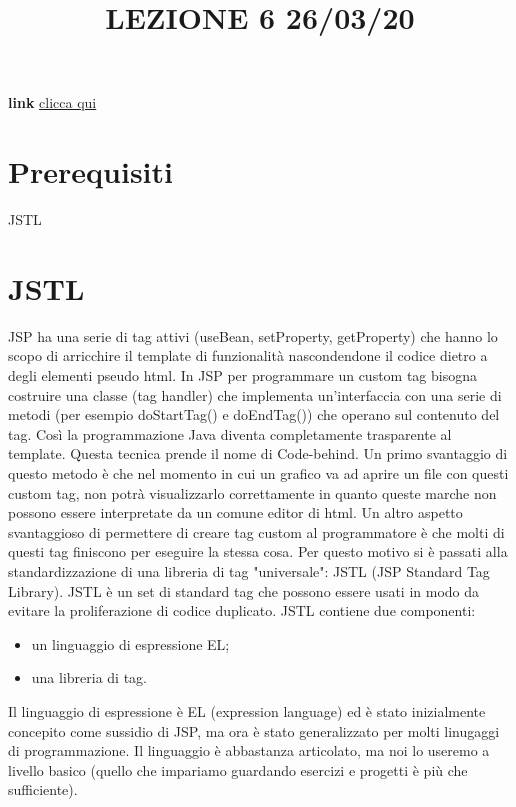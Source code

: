 \title{LEZIONE 6 26/03/20}\newline
\textbf{link} \href{https://web.microsoftstream.com/video/ee54067c-9686-4347-ba02-4b8a9715c174}{clicca qui}
\section*{Prerequisiti}
JSTL
\section{JSTL}
JSP ha una serie di tag attivi (useBean, setProperty, getProperty) che hanno lo scopo di arricchire il template di funzionalità nascondendone il codice dietro a degli elementi pseudo html. In JSP per programmare un custom tag bisogna costruire una classe (tag handler) che implementa un'interfaccia con una serie di metodi (per esempio doStartTag() e doEndTag()) che operano sul contenuto  del tag. Così la programmazione Java diventa completamente trasparente al template. Questa tecnica prende il nome di Code-behind.\newline
\newline
Un primo svantaggio di questo metodo è che nel momento in cui un grafico va ad aprire un file con questi custom tag, non potrà visualizzarlo correttamente in quanto queste marche non possono essere interpretate da un comune editor di html.\newline
Un altro aspetto svantaggioso di permettere di creare tag custom al programmatore è che molti di questi tag finiscono per eseguire la stessa cosa. Per questo motivo si è passati alla standardizzazione di una libreria di tag "universale": JSTL (JSP Standard Tag Library).\newline
\newline
JSTL è un set di standard tag che possono essere usati in modo da evitare la proliferazione di codice duplicato.\newline
\newline
JSTL contiene due componenti:
\begin{itemize}
    \item un linguaggio di espressione EL;
    \item una libreria di tag.
\end{itemize}
Il linguaggio di espressione è EL (expression language) ed è stato inizialmente concepito come sussidio di JSP, ma ora è stato generalizzato per molti linugaggi di programmazione. Il linguaggio è abbastanza articolato, ma noi lo useremo a livello basico (quello che impariamo guardando esercizi e progetti è più che sufficiente).\newline
